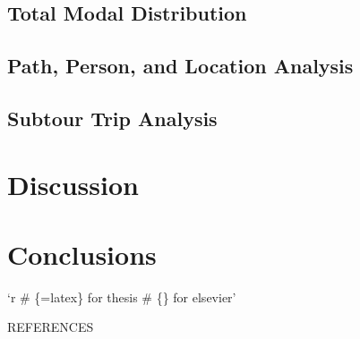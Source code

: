 \documentclass[12pt, oneside, openright]{byuthesis}
\begin{document}
\hypertarget{total-modal-distribution}{%
\section{Total Modal Distribution}\label{total-modal-distribution}}

\hypertarget{path-person-and-location-analysis}{%
\section{Path, Person, and Location Analysis}\label{path-person-and-location-analysis}}

\hypertarget{subtour-trip-analysis}{%
\section{Subtour Trip Analysis}\label{subtour-trip-analysis}}

\hypertarget{discussion}{%
\chapter{Discussion}\label{discussion}}

\hypertarget{conclusions}{%
\chapter{Conclusions}\label{conclusions}}

`r
\# \{=latex\} for thesis
\# \{\} for elsevier'

\cleardoublepage
    \begin{centering}
    REFERENCES\\
     \baselineskip
    \end{centering}
    
\end{document}
